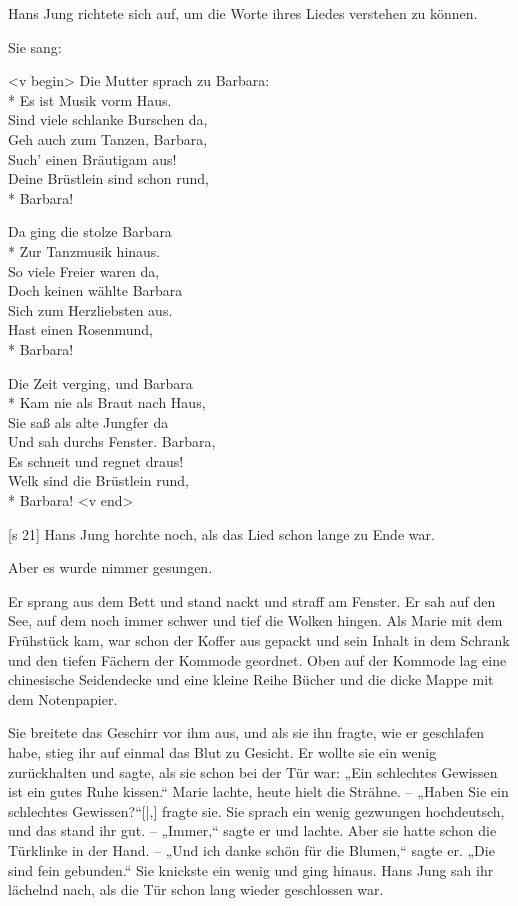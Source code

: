 Hans Jung richtete sich auf, um die Worte ihres
Liedes verstehen zu können.

Sie sang:

<v begin>
Die Mutter sprach zu Barbara:\\*
Es ist Musik vorm Haus.\\
Sind viele schlanke Burschen da,\\
Geh auch zum Tanzen, Barbara,\\
Such' einen Bräutigam aus!\\
Deine Brüstlein sind schon rund,\\*
Barbara!

Da ging die stolze Barbara\\*
Zur Tanzmusik hinaus.\\
So viele Freier waren da,\\
Doch keinen wählte Barbara\\
Sich zum Herzliebsten aus.\\
Hast einen Rosenmund,\\*
Barbara!

Die Zeit verging, und Barbara\\*
Kam nie als Braut nach Haus,\\
Sie saß als alte Jungfer da\\
Und sah durchs Fenster. Barbara,\\
Es schneit und regnet draus!\\
Welk sind die Brüstlein rund,\\*
Barbara!
<v end>

[s 21]
Hans Jung horchte noch, als das Lied schon
lange zu Ende war.

Aber es wurde nimmer gesungen.

Er sprang aus dem Bett und stand nackt und
straff am Fenster. Er sah auf den See, auf dem noch
immer schwer und tief die Wolken hingen. Als Marie
mit dem Frühstück kam, war schon der Koffer aus­
gepackt und sein Inhalt in dem Schrank und den
tiefen Fächern der Kommode geordnet. Oben auf
der Kommode lag eine chinesische Seidendecke und
eine kleine Reihe Bücher und die dicke Mappe mit
dem Notenpapier.

Sie breitete das Geschirr vor ihm aus, und als
sie ihn fragte, wie er geschlafen habe, stieg ihr auf
einmal das Blut zu Gesicht. Er wollte sie ein wenig
zurückhalten und sagte, als sie schon bei der Tür
war: „Ein schlechtes Ge­wissen ist ein gutes Ruhe­
kissen.“ Marie lachte, heute hielt die Strähne. –
„Haben Sie ein schlechtes Gewissen?“[|,] fragte sie.
Sie sprach ein wenig gezwungen hochdeutsch, und
das stand ihr gut. – „Immer,“ sagte er und lachte.
Aber sie hatte schon die Türklinke in der Hand. –
„Und ich danke schön für die Blumen,“ sagte er.
„Die sind fein gebunden.“ Sie knickste ein wenig
und ging hinaus. Hans Jung sah ihr lächelnd nach,
als die Tür schon lang wieder geschlossen war.

